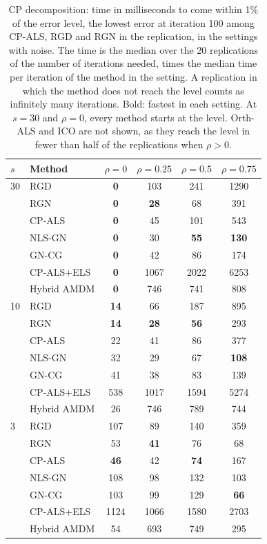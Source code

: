 \begin{table}[!htbp]
\centering
\caption{CP decomposition: time in milliseconds to come within 1\% of the error level, the lowest error at iteration 100 among CP-ALS, RGD and RGN in the replication, in the settings with noise. The time is the median over the 20 replications of the number of iterations needed, times the median time per iteration of the method in the setting. A replication in which the method does not reach the level counts as infinitely many iterations. Bold: fastest in each setting. At $s=30$ and $\rho=0$, every method starts at the level. Orth-ALS and ICO are not shown, as they reach the level in fewer than half of the replications when $\rho>0$.}
\label{tab:time_decomposition}
{\small
\begin{tabular}{llcccc}
\toprule
$s$ & Method & $\rho=0$ & $\rho=0.25$ & $\rho=0.5$ & $\rho=0.75$ \\
\midrule
30 & RGD & \textbf{0} & 103 & 241 & 1290 \\
 & RGN & \textbf{0} & \textbf{28} & 68 & 391 \\
 & CP-ALS & \textbf{0} & 45 & 101 & 543 \\
 & NLS-GN & \textbf{0} & 30 & \textbf{55} & \textbf{130} \\
 & GN-CG & \textbf{0} & 42 & 86 & 174 \\
 & CP-ALS+ELS & \textbf{0} & 1067 & 2022 & 6253 \\
 & Hybrid AMDM & \textbf{0} & 746 & 741 & 808 \\
\midrule
10 & RGD & \textbf{14} & 66 & 187 & 895 \\
 & RGN & \textbf{14} & \textbf{28} & \textbf{56} & 293 \\
 & CP-ALS & 22 & 41 & 86 & 377 \\
 & NLS-GN & 32 & 29 & 67 & \textbf{108} \\
 & GN-CG & 41 & 38 & 83 & 139 \\
 & CP-ALS+ELS & 538 & 1017 & 1594 & 5274 \\
 & Hybrid AMDM & 26 & 746 & 789 & 744 \\
\midrule
3 & RGD & 107 & 89 & 140 & 359 \\
 & RGN & 53 & \textbf{41} & 76 & 68 \\
 & CP-ALS & \textbf{46} & 42 & \textbf{74} & 167 \\
 & NLS-GN & 108 & 98 & 132 & 103 \\
 & GN-CG & 103 & 99 & 129 & \textbf{66} \\
 & CP-ALS+ELS & 1124 & 1066 & 1580 & 2703 \\
 & Hybrid AMDM & 54 & 693 & 749 & 295 \\
\bottomrule
\end{tabular}}
\end{table}
